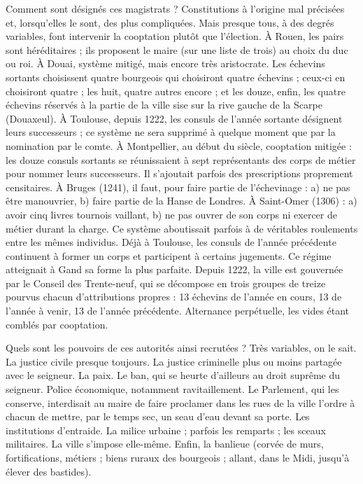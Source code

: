 \documentclass[french,twoside]{book} %
\begin{document}
Comment sont désignés ces magistrats ? Constitutions à l’origine mal précisées et, lorsqu’elles le sont, des plus compliquées. Mais presque tous, à des degrés variables, font intervenir la cooptation plutôt que l’élection. À Rouen, les pairs sont héréditaires ; ils proposent le maire (sur une liste de trois) au choix du duc ou roi. À Douai, système mitigé, mais encore très aristocrate. Les échevins sortants choisissent quatre bourgeois qui choisiront quatre échevins ; ceux-ci en choisiront quatre ; les huit, quatre autres encore ; et les douze, enfin, les quatre échevins réservés à la partie de la ville sise sur la rive gauche de la Scarpe (Douaxeul). À Toulouse, depuis 1222, les consuls de l’année sortante désignent leurs successeurs ; ce système ne sera supprimé à quelque moment que par la nomination par le comte. À Montpellier, au début du siècle, cooptation mitigée : les douze consuls sortants se réunissaient à sept représentants des corps de métier pour nommer leurs successeurs. Il s’ajoutait parfois des prescriptions proprement censitaires. À Bruges (1241), il faut, pour faire partie de l’échevinage : a) ne pas être manouvrier, b) faire partie de la Hanse de Londres. À Saint-Omer (1306) : a) avoir cinq livres tournois vaillant, b) ne pas ouvrer de son corps ni exercer de métier durant la charge. Ce système aboutissait parfois à de véritables roulements entre les mêmes individus. Déjà à Toulouse, les consuls de l’année précédente continuent à former un corps et participent à certains jugements. Ce régime atteignait à Gand sa forme la plus parfaite. Depuis 1222, la ville est gouvernée par le Conseil des Trente-neuf, qui se décompose en trois groupes de treize pourvus chacun d’attributions propres : 13 échevins de l’année en cours, 13 de l’année à venir, 13 de l’année précédente. Alternance perpétuelle, les vides étant comblés par cooptation.\par
Quels sont les pouvoirs de ces autorités ainsi recrutées ? Très variables, on le sait. La justice civile presque toujours. La justice criminelle plus ou moins partagée avec le seigneur. La paix. Le ban, qui se heurte d’ailleurs au droit suprême du seigneur. Police économique, notamment ravitaillement. Le Parlement, qui les conserve, interdisait au maire de faire proclamer dans les rues de la ville l’ordre à chacun de mettre, par le temps sec, un seau d’eau devant sa porte. Les institutions d’entraide. La milice urbaine ; parfois les remparts ; les sceaux militaires. La ville s’impose elle-même. Enfin, la banlieue (corvée de murs, fortifications, métiers ; biens ruraux des bourgeois ; allant, dans le Midi, jusqu’à élever des bastides).\par
\end{document}
